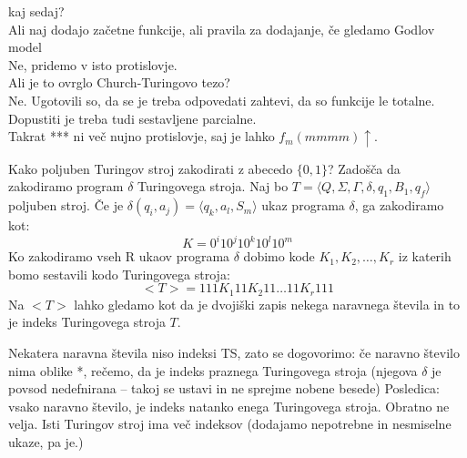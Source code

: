 \documentclass[10pt,a4paper,oneside]{book}
\begin{document}
\begin{neurejeno}
{	kaj sedaj?\\
	Ali naj dodajo začetne funkcije, ali pravila za dodajanje, če gledamo Godlov model\\%
	Ne, pridemo v isto protislovje.\\

	Ali je to ovrglo Church-Turingovo tezo?\\
	Ne. Ugotovili so, da se je treba odpovedati zahtevi, da so funkcije le totalne. Dopustiti je treba tudi sestavljene parcialne.\\
	Takrat *** ni več nujno protislovje, saj je lahko $f_m(mmmm)\uparrow$.
}


Kako poljuben Turingov stroj zakodirati z abecedo $\{0,1\}$?
Zadošča da zakodiramo program $\delta$ Turingovega stroja.%
Naj bo $T=\langle Q,\Sigma,\Gamma,\delta,q_1,B_1,q_f \rangle$ poljuben stroj.%
Če je $\delta(q_i,a_j)=\langle q_k, a_l, S_m \rangle$ ukaz programa $\delta$, ga zakodiramo kot:
	\[ K=0^i 1 0^j 1 0^k 1 0^l 1 0^m\]
Ko zakodiramo vseh R ukaov programa $\delta$ dobimo kode $K_1, K_2, \dots, K_r$ iz katerih bomo sestavili kodo Turingovega stroja:
	\[ <T> = 111 K_1 11 K_2 11 \dots 11 K_r 111\]%
Na $<T>$ lahko gledamo kot da je dvojiški zapis nekega naravnega števila in to je indeks Turingovega stroja $T$.

Nekatera naravna števila niso indeksi TS, zato se dogovorimo: če naravno število nima oblike *, rečemo, da je indeks praznega Turingovega stroja (njegova $\delta$ je povsod nedefnirana -- takoj se ustavi in ne sprejme nobene besede)
Posledica: vsako naravno število, je indeks natanko enega Turingovega stroja.
Obratno ne velja. Isti Turingov stroj ima več indeksov (dodajamo nepotrebne in nesmiselne ukaze, pa je.)
%



\end{neurejeno}
\end{document}
